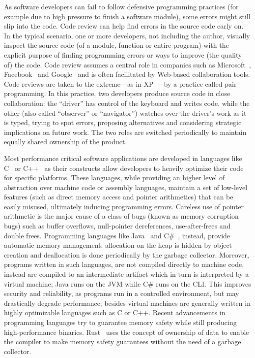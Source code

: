 As software developers can fail to follow defensive programming practices (for
example due to high pressure to finish a software module), some errors might
still slip into the code. Code review can help find errors in the source code
early on. In the typical scenario, one or more developers, not including the
author, visually inspect the source code (of a module, function or entire
program) with the explicit purpose of finding programming errors or ways to
improve (the quality of) the code. Code review assumes a central role in
companies such as Microsoft~\cite{bacchelli2013expectations},
Facebook~\cite{feitelson2013development} and Google~\cite{kennedy2006google} and
is often facilitated by Web-based collaboration tools. Code reviews are taken to
the extreme---as in \ac{XP}~\cite{Beck2004EPE}---by a practice called pair
programming. In this practice, two developers produce source code in close
collaboration: the ``driver'' has control of the keyboard and writes code, while
the other (also called ``observer'' or ``navigator'') watches over the driver's
work as it is typed, trying to spot errors, proposing alternatives and
considering strategic implications on future work. The two roles are switched
periodically to maintain equally shared ownership of the product.

Most performance critical software applications are developed in languages like
C~\cite{Kernighan1988CPL} or C++~\cite{Stroustrup2013CPL} as their constructs
allow developers to heavily optimize their code for specific platforms. These
languages, while providing an higher level of abstraction over machine code or
assembly languages, maintain a set of low-level features (such as direct memory
access and pointer arithmetics) that can be easily misused, ultimately inducing
programming errors. Careless use of pointer arithmetic is the major cause of a
class of bugs (known as memory corruption bugs) such as buffer overflows,
null-pointer dereferences, use-after-frees and double frees. Programming
languages like Java~\cite{Gosling2014JLS} and C\#~\cite{Hejlsberg2003CLS},
instead, provide automatic memory management: allocation on the heap is hidden
by object creation and deallocation is done periodically by the garbage
collector. Moreover, programs written in such languages, are not compiled
directly to machine code, instead are compiled to an intermediate artifact which
in turn is interpreted by a virtual machine; Java runs on the \ac{JVM} while C\#
runs on the \ac{CLI}. This improves security and reliability, as programs run in
a controlled environment, but may drastically degrade performance; besides
virtual machines are generally written in highly optimizable languages such as C
or C++. Recent advancements in programming languages try to guarantee memory
safety while still producing high-performance binaries.
Rust~\cite{Matsakis2014RL} uses the concept of ownership of data to enable the
compiler to make memory safety guarantees without the need of a garbage
collector.

